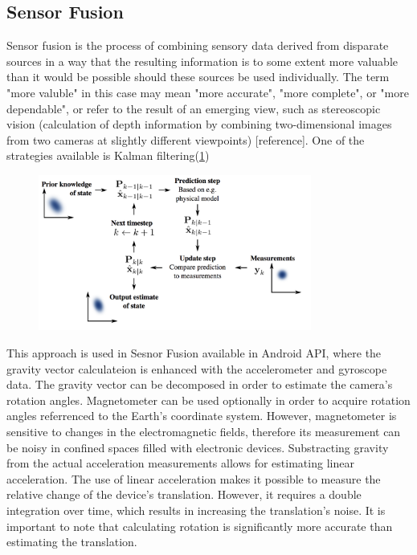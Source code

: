 \subsection{Sensor Fusion}
Sensor fusion is the process of combining sensory data derived from disparate
sources in a way that the resulting information is to some extent more valuable than it would be possible should these sources be used individually. The term "more valuble" in this case may mean "more
accurate", "more complete", or "more dependable", or refer to the result of an emerging view, such
as stereoscopic vision (calculation of depth information by combining two-dimensional
images from two cameras at slightly different viewpoints) [reference]. One of the strategies available is Kalman filtering(\ref{fig:Kalmann})
\begin{figure}[p]
    \centering
    \includegraphics[width=0.8\textwidth]{Kalmann}
    \caption{}
    \label{fig:Kalmann}
\end{figure}
This approach is used in Sesnor Fusion available in Android API, where the gravity vector calculateion is enhanced with the accelerometer and gyroscope data. The gravity vector can be decomposed in order to estimate the camera's rotation angles. Magnetometer can be used optionally in order to acquire rotation angles referrenced to the Earth's coordinate system. However, magnetometer is sensitive to changes in the electromagnetic fields, therefore its measurement can be noisy in confined spaces filled with electronic devices. Substracting gravity from the actual acceleration measurements allows for estimating linear acceleration. The use of linear acceleration makes it possible to measure the relative change of the device's translation. However, it requires a double integration over time, which results in increasing the translation's noise. It is important to note that calculating rotation is significantly more accurate than estimating the translation. 


